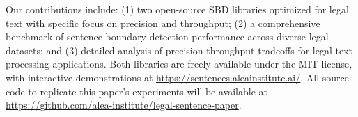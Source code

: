 Our contributions include: (1) two open-source SBD libraries optimized for legal text with specific focus on precision and throughput; (2) a comprehensive benchmark of sentence boundary detection performance across diverse legal datasets; and (3) detailed analysis of precision-throughput tradeoffs for legal text processing applications. Both libraries are freely available under the MIT license, with interactive demonstrations at \url{https://sentences.aleainstitute.ai/}. All source code to replicate this paper's experiments will be available at \url{https://github.com/alea-institute/legal-sentence-paper}.